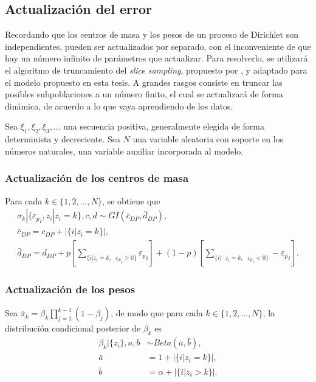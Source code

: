 \subsection{Actualizaci\'on del error}

Recordando que los centros de masa y los pesos de un proceso de Dirichlet son independientes, pueden ser actualizados por separado, con el inconveniente de que hay un n\'umero infinito de par\'ametros que actualizar. Para resolverlo, se utilizará el algoritmo de truncamiento del \textit{slice sampling}, propuesto por \cite{Kalli_Slice}, y adaptado para el modelo propuesto en esta tesis. A grandes rasgos consiste en truncar las posibles subpoblaciones a un número finito, el cual se actualizar\'a de forma din\'amica, de acuerdo a lo que vaya aprendiendo de los datos. 

Sea $\xi_1,\xi_2,\xi_3,...$ una secuencia positiva, generalmente elegida de forma determinista y decreciente. Sea $N$ una variable aleatoria con soporte en los n\'umeros naturales, una variable auxiliar incorporada al modelo.

\subsubsection{Actualizaci\'on de los centros de masa}

Para cada $k \in \{1,2,...,N\}$, se obtiene que 
\begin{equation*}
\begin{gathered}
    \sigma_k | \{{\varepsilon_p}_i, z_i | z_i = k\}, c, d \sim GI(\bar{c}_{DP}, \bar{d}_{DP}),\\
    \bar{c}_{DP} = c_{DP} + |\{i| z_i = k\}|, \\
    \bar{d}_{DP} = d_{DP} 
    + p \left[\sum_{\{i| z_i = k,\text{ }{\varepsilon_p}_i \geq 0\}} {\varepsilon_p}_i\right]
    + (1-p) \left[\sum_{\{i| \text{ } z_i = k,\text{ }{\varepsilon_p}_i < 0\}}  -{\varepsilon_p}_i\right].
\end{gathered}
\end{equation*}

\subsubsection{Actualizaci\'on de los pesos}

Sea $\bar{\pi}_k = \beta_k \prod_{j=1}^{k-1}(1 - \beta_j)$, de modo que para cada $k \in \{1,2,...,N\}$, la distribuci\'on condicional posterior de $\beta_k$ es
\begin{equation*}
\begin{aligned}
    \beta_k|\{z_i\}, a,b &\sim Beta(\bar{a}, \bar{b}), \\
    \bar{a} &= 1 + |\{i|z_i = k\}|, \\
    \bar{b} &= \alpha + |\{i|z_i > k\}|.
\end{aligned}
\end{equation*}


